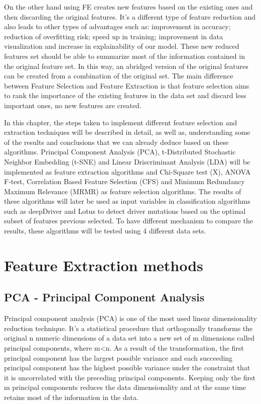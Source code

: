 On the other hand using FE creates new features based on the existing ones and then discarding the original features. It's a different type of feature reduction and also leads to other types of advantages such as: improvement in accuracy; reduction of overfitting risk; speed up in training; improvement in data visualization and increase in explainability of our model. These new reduced features set should be able to summarize most of the information contained in the original feature set. In this way, an abridged version of the original features can be created from a combination of the original set. The main difference between Feature Selection and Feature Extraction is that feature selection aims to rank the importance of the existing features in the data set and discard less important ones, no new features are created.

In this chapter, the steps taken to implement different feature selection and extraction techniques will be described in detail, as well as, understanding some of the results and conclusions that we can already deduce based on these algorithms. Principal Component Analysis (PCA), t-Distributed Stochastic Neighbor Embedding (t-SNE) and Linear Driscriminant Analysis (LDA) will be implemented as feature extraction algorithms and Chi-Square test (X), ANOVA F-test, Correlation Based Feature Selection (CFS) and Minimum Redundancy Maximum Relevance (MRMR) as feature selection algorithms. The results of these algorithms will later be used as input variables in classification algorithms such as deepDriver and Lotus to detect driver mutations based on the optimal subset of features previous selected. To have different mechanism to compare the results, these algorithms will be tested using 4 different data sets.

\section{Feature Extraction methods} %
\label{sec:feature_selection}

\subsection{PCA - Principal Component Analysis} %
\label{sec:pca}
\hspace{10px}Principal component analysis (PCA) is one of the most used linear dimensionality reduction technique. It's a statistical procedure that orthogonally transforms the original n numeric dimensions of a data set into a new set of m dimensions called principal components, where m<n. As a result of the transformation, the first principal component has the largest possible variance and each succeeding principal component has the highest possible variance under the constraint that it is uncorrelated with the preceding principal components. Keeping only the first m principal components reduces the data dimensionality and at the same time retains most of the information in the data.

